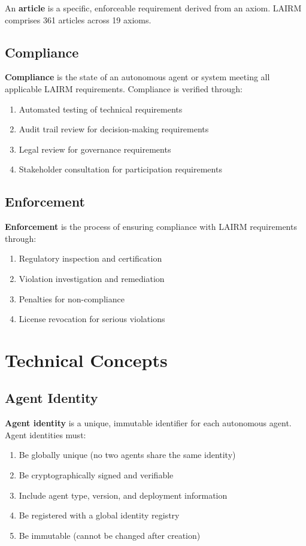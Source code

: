 \documentclass[12pt,a4paper,twoside,openright]{book}
\begin{document}
An \textbf{article} is a specific, enforceable requirement derived from an axiom. LAIRM comprises 361 articles across 19 axioms.

\subsection{Compliance}

\textbf{Compliance} is the state of an autonomous agent or system meeting all applicable LAIRM requirements. Compliance is verified through:
\begin{enumerate}
    \item Automated testing of technical requirements
    \item Audit trail review for decision-making requirements
    \item Legal review for governance requirements
    \item Stakeholder consultation for participation requirements
\end{enumerate}

\subsection{Enforcement}

\textbf{Enforcement} is the process of ensuring compliance with LAIRM requirements through:
\begin{enumerate}
    \item Regulatory inspection and certification
    \item Violation investigation and remediation
    \item Penalties for non-compliance
    \item License revocation for serious violations
\end{enumerate}

\section{Technical Concepts}

\subsection{Agent Identity}

\textbf{Agent identity} is a unique, immutable identifier for each autonomous agent. Agent identities must:
\begin{enumerate}
    \item Be globally unique (no two agents share the same identity)
    \item Be cryptographically signed and verifiable
    \item Include agent type, version, and deployment information
    \item Be registered with a global identity registry
    \item Be immutable (cannot be changed after creation)
\end{enumerate}
\end{document}
